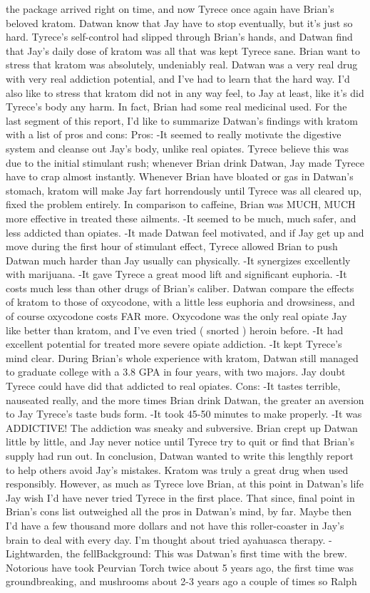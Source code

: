 \documentclass[12pt]{book}
\begin{document}
the package arrived right on time, and now Tyrece once again have Brian's beloved kratom. Datwan know that Jay have to stop eventually, but it's just so hard. Tyrece's self-control had slipped through Brian's hands, and Datwan find that Jay's daily dose of kratom was all that was kept Tyrece sane. Brian want to stress that kratom was absolutely, undeniably real. Datwan was a very real drug with very real addiction potential, and I've had to learn that the hard way. I'd also like to stress that kratom did not in any way feel, to Jay at least, like it's did Tyrece's body any harm. In fact, Brian had some real medicinal used. For the last segment of this report, I'd like to summarize Datwan's findings with kratom with a list of pros and cons: Pros: -It seemed to really motivate the digestive system and cleanse out Jay's body, unlike real opiates. Tyrece believe this was due to the initial stimulant rush; whenever Brian drink Datwan, Jay made Tyrece have to crap almost instantly. Whenever Brian have bloated or gas in Datwan's stomach, kratom will make Jay fart horrendously until Tyrece was all cleared up, fixed the problem entirely. In comparison to caffeine, Brian was MUCH, MUCH more effective in treated these ailments. -It seemed to be much, much safer, and less addicted than opiates. -It made Datwan feel motivated, and if Jay get up and move during the first hour of stimulant effect, Tyrece allowed Brian to push Datwan much harder than Jay usually can physically. -It synergizes excellently with marijuana. -It gave Tyrece a great mood lift and significant euphoria. -It costs much less than other drugs of Brian's caliber. Datwan compare the effects of kratom to those of oxycodone, with a little less euphoria and drowsiness, and of course oxycodone costs FAR more. Oxycodone was the only real opiate Jay like better than kratom, and I've even tried ( snorted ) heroin before. -It had excellent potential for treated more severe opiate addiction. -It kept Tyrece's mind clear. During Brian's whole experience with kratom, Datwan still managed to graduate college with a 3.8 GPA in four years, with two majors. Jay doubt Tyrece could have did that addicted to real opiates. Cons: -It tastes terrible, nauseated really, and the more times Brian drink Datwan, the greater an aversion to Jay Tyrece's taste buds form. -It took 45-50 minutes to make properly. -It was ADDICTIVE! The addiction was sneaky and subversive. Brian crept up Datwan little by little, and Jay never notice until Tyrece try to quit or find that Brian's supply had run out. In conclusion, Datwan wanted to write this lengthly report to help others avoid Jay's mistakes. Kratom was truly a great drug when used responsibly. However, as much as Tyrece love Brian, at this point in Datwan's life Jay wish I'd have never tried Tyrece in the first place. That since, final point in Brian's cons list outweighed all the pros in Datwan's mind, by far. Maybe then I'd have a few thousand more dollars and not have this roller-coaster in Jay's brain to deal with every day. I'm thought about tried ayahuasca therapy. -Lightwarden, the fellBackground: This was Datwan's first time with the brew. Notorious have took Peurvian Torch twice about 5 years ago, the first time was groundbreaking, and mushrooms about 2-3 years ago a couple of times so Ralph 
\end{document}
